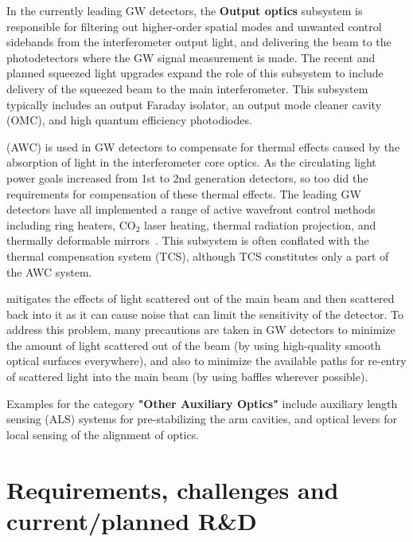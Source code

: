 \noindent
In the currently leading GW detectors, the {\bf Output optics} subsystem is responsible for filtering out higher-order spatial modes and unwanted control sidebands from the interferometer output light, and delivering the beam to the photodetectors where the GW signal measurement is made. The recent and planned squeezed light upgrades expand the role of this subsystem to include delivery of the squeezed beam to the main interferometer. This subsystem typically includes an output Faraday isolator, an output mode cleaner cavity (OMC), and high quantum efficiency photodiodes.

 (AWC) is used in GW detectors to compensate for thermal effects caused by the absorption of light in the interferometer core optics. As the circulating light power goals increased from 1st to 2nd generation detectors, so too did the requirements for compensation of these thermal effects. The leading GW detectors have all implemented a range of active wavefront control methods including ring heaters, CO$_2$ laser heating, thermal radiation projection, and thermally deformable mirrors~\cite{aLIGO_AWC, AdVirgo_IO}. This subsystem is often conflated with the thermal compensation system (TCS), although TCS constitutes only a part of the AWC system. 

mitigates the effects of light scattered out of the main beam and then scattered back into it as it can cause noise that can limit the sensitivity of the detector.
To address this problem, many precautions are taken in GW detectors to minimize the amount of light scattered out of the beam (by using high-quality smooth optical surfaces everywhere), and also to minimize the available paths for re-entry of scattered light into the main beam (by using baffles wherever possible). 

\noindent 
Examples for the category {\bf "Other Auxiliary Optics"} include auxiliary length sensing (ALS) systems for pre-stabilizing the arm cavities, and optical levers for local sensing of the alignment of optics.

\section{Requirements, challenges and current/planned R\&D}
